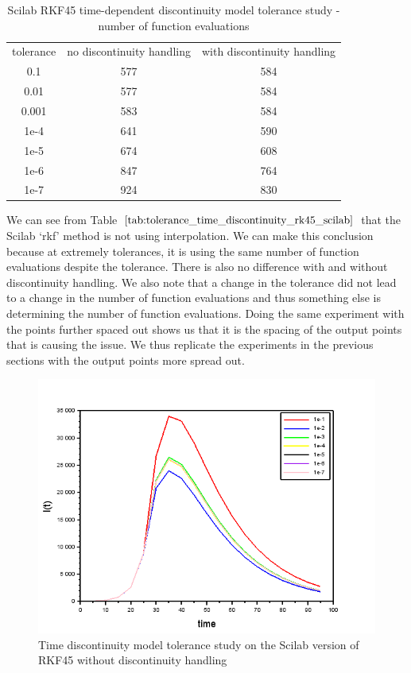 \begin{table}[H]
\caption {Scilab RKF45 time-dependent discontinuity model tolerance study - number of function evaluations} 
\label{tab:tolerance_time_discontinuity_rk45_scilab} 
\begin{center}
\begin{tabular}{ c c c }
tolerance & no discontinuity handling & with discontinuity handling\\ 
0.1 & 577 & 584 \\
0.01 & 577 & 584 \\
0.001 & 583 & 584 \\
1e-4 & 641 & 590 \\
1e-5 & 674 & 608 \\
1e-6 & 847 & 764 \\
1e-7 & 924 & 830 \\
\end{tabular}
\end{center}
\end{table}
We can see from Table $\ref{tab:tolerance_time_discontinuity_rk45_scilab}$ that the Scilab `rkf' method is not using interpolation. We can make this conclusion because at extremely tolerances, it is using the same number of function evaluations despite the tolerance. There is also no difference with and without discontinuity handling. We also note that a change in the tolerance did not lead to a change in the number of function evaluations and thus something else is determining the number of function evaluations. Doing the same experiment with the points further spaced out shows us that it is the spacing of the output points that is causing the issue. We thus replicate the experiments in the previous sections with the output points more spread out.
\begin{figure}[H]
\centering
\includegraphics[width=0.7\linewidth]{./figures/tolerance_time_rkf_further_no_event_sci}
\caption{Time discontinuity model tolerance study on the Scilab version of RKF45 without discontinuity handling}
\label{fig:tolerance_time_rkf_further_no_event_sci}
\end{figure}

